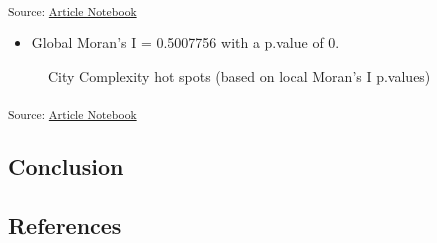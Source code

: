 \documentclass[
]{agujournal2019}
\providecommand{\tightlist}{%
  \setlength{\itemsep}{0pt}\setlength{\parskip}{0pt}}\usepackage{longtable,booktabs,array}
\begin{document}
\textsubscript{Source:
\href{https://aiti-flinders.github.io/sirp-complexity/index-preview.html}{Article
Notebook}}

\begin{itemize}
\tightlist
\item
  Global Moran's I = 0.5007756 with a p.value of 0.
\end{itemize}

\label{cell-fig-complexity-hot-spots}
\begin{figure}[H]


\caption{\label{fig-complexity-hot-spots}City Complexity hot spots
(based on local Moran's I p.values)}

\end{figure}%

\textsubscript{Source:
\href{https://aiti-flinders.github.io/sirp-complexity/index-preview.html}{Article
Notebook}}

\subsection{Conclusion}\label{conclusion}

\subsection*{References}\label{references}
\end{document}
